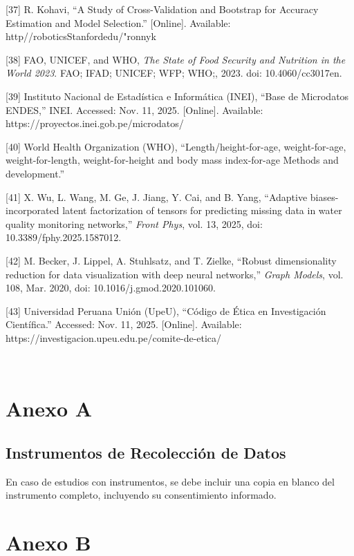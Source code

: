 \documentclass[
]{report}
\begin{document}
{[}37{]} R. Kohavi, ``A Study of Cross-Validation and Bootstrap for
Accuracy Estimation and Model Selection.'' {[}Online{]}. Available:
http//roboticsStanfordedu/"ronnyk

{[}38{]} FAO, UNICEF, and WHO, \emph{The State of Food Security and
Nutrition in the World 2023}. FAO; IFAD; UNICEF; WFP; WHO;, 2023. doi:
10.4060/cc3017en.

{[}39{]} Instituto Nacional de Estadística e Informática (INEI), ``Base
de Microdatos ENDES,'' INEI. Accessed: Nov. 11, 2025. {[}Online{]}.
Available: https://proyectos.inei.gob.pe/microdatos/

{[}40{]} World Health Organization (WHO), ``Length/height-for-age,
weight-for-age, weight-for-length, weight-for-height and body mass
index-for-age Methods and development.''

{[}41{]} X. Wu, L. Wang, M. Ge, J. Jiang, Y. Cai, and B. Yang,
``Adaptive biases-incorporated latent factorization of tensors for
predicting missing data in water quality monitoring networks,''
\emph{Front Phys}, vol. 13, 2025, doi: 10.3389/fphy.2025.1587012.

{[}42{]} M. Becker, J. Lippel, A. Stuhlsatz, and T. Zielke, ``Robust
dimensionality reduction for data visualization with deep neural
networks,'' \emph{Graph Models}, vol. 108, Mar. 2020, doi:
10.1016/j.gmod.2020.101060.

{[}43{]} Universidad Peruana Unión (UpeU), ``Código de Ética en
Investigación Científica.'' Accessed: Nov. 11, 2025. {[}Online{]}.
Available: https://investigacion.upeu.edu.pe/comite-de-etica/

~

\hypertarget{anexo-a}{%
\section{Anexo A}\label{anexo-a}}

\hypertarget{instrumentos-de-recolecciuxf3n-de-datos}{%
\subsection{Instrumentos de Recolección de
Datos}\label{instrumentos-de-recolecciuxf3n-de-datos}}

En caso de estudios con instrumentos, se debe incluir una copia en
blanco del instrumento completo, incluyendo su consentimiento informado.

\hypertarget{anexo-b}{%
\section{Anexo B}\label{anexo-b}}
\end{document}
